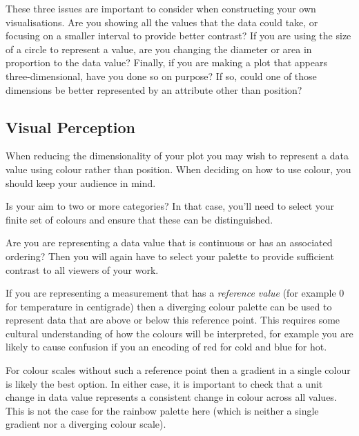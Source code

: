\documentclass[
  letterpaper,
  DIV=11,
  numbers=noendperiod]{scrreprt}
\begin{document}
These three issues are important to consider when constructing your own
visualisations. Are you showing all the values that the data could take,
or focusing on a smaller interval to provide better contrast? If you are
using the size of a circle to represent a value, are you changing the
diameter or area in proportion to the data value? Finally, if you are
making a plot that appears three-dimensional, have you done so on
purpose? If so, could one of those dimensions be better represented by
an attribute other than position?

\subsection{Visual Perception}\label{visual-perception}

When reducing the dimensionality of your plot you may wish to represent
a data value using colour rather than position. When deciding on how to
use colour, you should keep your audience in mind.

Is your aim to two or more categories? In that case, you'll need to
select your finite set of colours and ensure that these can be
distinguished.

Are you are representing a data value that is continuous or has an
associated ordering? Then you will again have to select your palette to
provide sufficient contrast to all viewers of your work.

If you are representing a measurement that has a \emph{reference value}
(for example 0 for temperature in centigrade) then a diverging colour
palette can be used to represent data that are above or below this
reference point. This requires some cultural understanding of how the
colours will be interpreted, for example you are likely to cause
confusion if you an encoding of red for cold and blue for hot.

For colour scales without such a reference point then a gradient in a
single colour is likely the best option. In either case, it is important
to check that a unit change in data value represents a consistent change
in colour across all values. This is not the case for the rainbow
palette here (which is neither a single gradient nor a diverging colour
scale).
\end{document}
